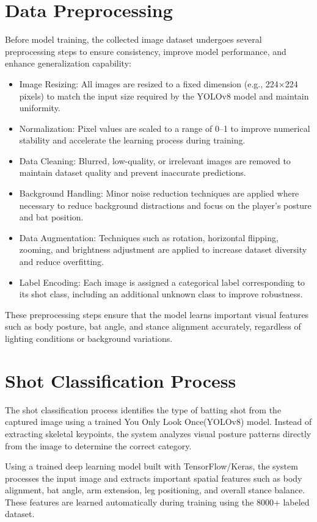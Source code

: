 \section{Data Preprocessing} \label{S4.4}
Before model training, the collected image dataset undergoes several preprocessing steps to ensure consistency, improve model performance, and enhance generalization capability:

\begin{itemize}
	\item Image Resizing: All images are resized to a fixed dimension (e.g., 224×224 pixels) to match the input size required by the YOLOv8 model and maintain uniformity.
    \item Normalization: Pixel values are scaled to a range of 0–1 to improve numerical stability and accelerate the learning process during training.
    \item Data Cleaning: Blurred, low-quality, or irrelevant images are removed to maintain dataset quality and prevent inaccurate predictions.
    \item Background Handling: Minor noise reduction techniques are applied where necessary to reduce background distractions and focus on the player’s posture and bat position.
    \item Data Augmentation: Techniques such as rotation, horizontal flipping, zooming, and brightness adjustment are applied to increase dataset diversity and reduce overfitting.
    \item Label Encoding: Each image is assigned a categorical label corresponding to its shot class, including an additional unknown class to improve robustness.
\end{itemize}
These preprocessing steps ensure that the model learns important visual features such as body posture, bat angle, and stance alignment accurately, regardless of lighting conditions or background variations.

\section{Shot Classification Process} \label{S4.5}
The shot classification process identifies the type of batting shot from the captured image using a trained You Only Look Once(YOLOv8) model. Instead of extracting skeletal keypoints, the system analyzes visual posture patterns directly from the image to determine the correct category.

Using a trained deep learning model built with TensorFlow/Keras, the system processes the input image and extracts important spatial features such as body alignment, bat angle, arm extension, leg positioning, and overall stance balance. These features are learned automatically during training using the 8000+ labeled dataset.

